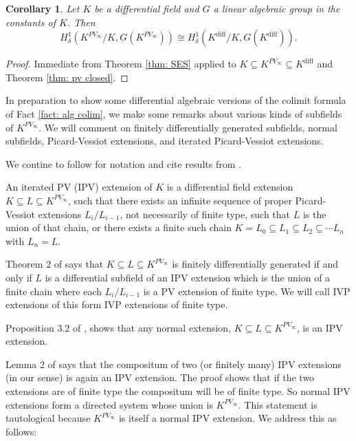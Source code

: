\documentclass{amsart}
\newtheorem{corollary}[theorem]{Corollary}
\theoremstyle{definition}
\theoremstyle{remark}
\numberwithin{equation}{section}
\def \diff {\operatorname{diff}}
\begin{document}
\begin{corollary}\label{cor: pv closed}\cite{AnandDavidComm}
    Let $K$ be a differential field and $G$ a linear algebraic group in the constants of $K$. Then $$H^1_{\delta}(K^{PV_\infty}/K,G(K^{PV_\infty})) \cong H^1_{\delta}(K^{\diff}/K,G(K^{\diff})).$$
\end{corollary}

\begin{proof}
    Immediate from Theorem \ref{thm: SES} applied to $K \subseteq K^{PV_\infty} \subseteq K^{\diff}$ and Theorem \ref{thm: pv closed}.
\end{proof}

In preparation to show some differential algebraic versions of the colimit formula of Fact \ref{fact: alg colim}, we make some remarks about various kinds of subfields of $K^{PV_\infty}$. We will comment on finitely differentially generated subfields, normal subfields, Picard-Vessiot extensions, and iterated Picard-Vessiot extensions. 

We contine to follow \cite{meretzky2026galoistheoryautomorphismgroups} for notation and cite results from \cite{magid2022completepicardvessiotclosure}. 

An iterated PV (IPV) extension of $K$ is a differential field extension $K \subseteq L\subseteq K^{PV_\infty}$, such that there exists an infinite sequence of proper Picard-Vessiot extensions $L_i/L_{i-1}$, 
not necessarily of finite type, such that $L$ is the union of that chain, or there exists a finite such chain $K = L_0 \subseteq L_1 \subseteq L_2 \subseteq \cdots L_n$ with $L_n = L$.  

Theorem 2 of \cite{magid2022completepicardvessiotclosure} says that $K \subseteq L \subseteq K^{PV_{\infty}}$ is finitely differentially generated if and only if $L$ is a differential subfield of an IPV extension which is the union of a finite chain where each $L_i/L_{i-1}$ is a PV extension of finite type. We will call IVP extensions of this form IVP extensions of finite type. 

Proposition 3.2 of \cite{meretzky2026galoistheoryautomorphismgroups}, shows that any normal extension, $K \subseteq L \subseteq K^{PV_\infty}$, is an IPV extension. 

Lemma 2 of \cite{magid2022completepicardvessiotclosure} says that the compositum of two (or finitely many) IPV  extensions (in our sense) is again an IPV extension. The proof shows that if the two extensions are of finite type the compositum will be of finite type.  So normal IPV extensions form a directed system whose union is $K^{PV_\infty}$. This statement is tautological because $K^{PV_\infty}$ is itself a normal IPV extension. We address this as follows:
\end{document}
